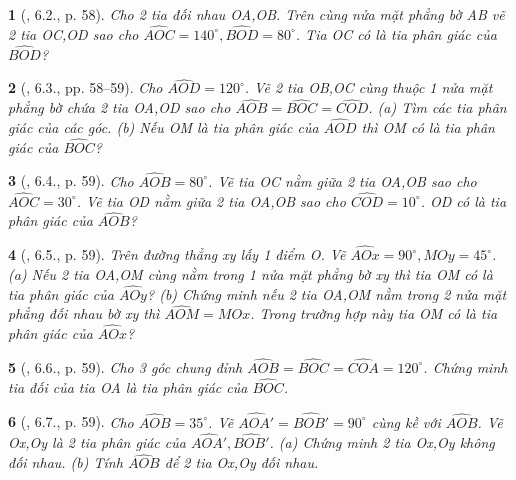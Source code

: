 \documentclass{article}
\newtheorem{baitoan}{}
\begin{document}
\begin{baitoan}[\cite{TLCT_THCS_Toan_6_hinh_hoc}, 6.2., p. 58]
	Cho 2 tia đối nhau OA,OB. Trên cùng nửa mặt phẳng bờ AB vẽ 2 tia OC,OD sao cho $\widehat{AOC} = 140^\circ,\widehat{BOD} = 80^\circ$. Tia OC có là tia phân giác của $\widehat{BOD}$?
\end{baitoan}

\begin{baitoan}[\cite{TLCT_THCS_Toan_6_hinh_hoc}, 6.3., pp. 58--59]
	Cho $\widehat{AOD} = 120^\circ$. Vẽ 2 tia OB,OC cùng thuộc 1 nửa mặt phẳng bờ chứa 2 tia OA,OD sao cho $\widehat{AOB} = \widehat{BOC} = \widehat{COD}$. (a) Tìm các tia phân giác của các góc. (b) Nếu OM là tia phân giác của $\widehat{AOD}$ thì OM có là tia phân giác của $\widehat{BOC}$?
\end{baitoan}

\begin{baitoan}[\cite{TLCT_THCS_Toan_6_hinh_hoc}, 6.4., p. 59]
	Cho $\widehat{AOB} = 80^\circ$. Vẽ tia OC nằm giữa 2 tia OA,OB sao cho $\widehat{AOC} = 30^\circ$. Vẽ tia OD nằm giữa 2 tia OA,OB sao cho $\widehat{COD} = 10^\circ$. OD có là tia phân giác của $\widehat{AOB}$?
\end{baitoan}

\begin{baitoan}[\cite{TLCT_THCS_Toan_6_hinh_hoc}, 6.5., p. 59]
	Trên đường thẳng xy lấy 1 điểm O. Vẽ $\widehat{AOx} = 90^\circ,\widehat{MOy} = 45^\circ$. (a) Nếu 2 tia OA,OM cùng nằm trong 1 nửa mặt phẳng bờ xy thì tia OM có là tia phân giác của $\widehat{AOy}$? (b) Chứng minh nếu 2 tia OA,OM nằm trong 2 nửa mặt phẳng đối nhau bờ xy thì $\widehat{AOM} = \widehat{MOx}$. Trong trường hợp này tia OM có là tia phân giác của $\widehat{AOx}$?
\end{baitoan}

\begin{baitoan}[\cite{TLCT_THCS_Toan_6_hinh_hoc}, 6.6., p. 59]
	Cho 3 góc chung đỉnh $\widehat{AOB} = \widehat{BOC} = \widehat{COA} = 120^\circ$. Chứng minh tia đối của tia OA là tia phân giác của $\widehat{BOC}$.
\end{baitoan}

\begin{baitoan}[\cite{TLCT_THCS_Toan_6_hinh_hoc}, 6.7., p. 59]
	Cho $\widehat{AOB} = 35^\circ$. Vẽ $\widehat{AOA'} = \widehat{BOB'} = 90^\circ$ cùng kề với $\widehat{AOB}$. Vẽ Ox,Oy là 2 tia phân giác của $\widehat{AOA'},\widehat{BOB'}$. (a) Chứng minh 2 tia Ox,Oy không đối nhau. (b) Tính $\widehat{AOB}$ để 2 tia Ox,Oy đối nhau.
\end{baitoan}
\end{document}
